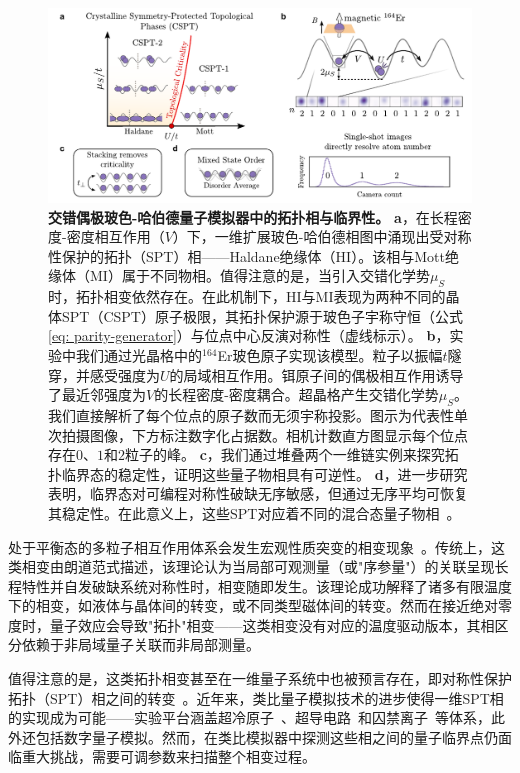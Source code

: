 \documentclass[preprint,superscriptaddress,floatfix,nofootinbib]{revtex4-2}
\begin{document}
\begin{figure}
    \centering
    \includegraphics[width=\textwidth]{figures/Fig_intro_v4.pdf}
    \caption{\textbf{交错偶极玻色-哈伯德量子模拟器中的拓扑相与临界性。}
    \textbf{a}，在长程密度-密度相互作用（$V$）下，一维扩展玻色-哈伯德相图\cite{Torre2006, Berg2008}中涌现出受对称性保护的拓扑（SPT）相——Haldane绝缘体（HI）。该相与Mott绝缘体（MI）属于不同物相。值得注意的是，当引入交错化学势$\mu_S$时，拓扑相变依然存在。在此机制下，HI与MI表现为两种不同的晶体SPT（CSPT）原子极限，其拓扑保护源于玻色子宇称守恒（公式\eqref{eq: parity-generator}）与位点中心反演对称性（虚线标示）\cite{Fuji2015}。
    \textbf{b}，实验中我们通过光晶格中的$^{164}$Er玻色原子实现该模型。粒子以振幅$t$隧穿，并感受强度为$U$的局域相互作用。铒原子间的偶极相互作用诱导了最近邻强度为$V$的长程密度-密度耦合。超晶格产生交错化学势$\mu_S$。我们直接解析了每个位点的原子数而无须宇称投影。图示为代表性单次拍摄图像，下方标注数字化占据数。相机计数直方图显示每个位点存在$0$、$1$和$2$粒子的峰。
    \textbf{c}，我们通过堆叠两个一维链实例来探究拓扑临界态的稳定性，证明这些量子物相具有可逆性。
    \textbf{d}，进一步研究表明，临界态对可编程对称性破缺无序敏感，但通过无序平均可恢复其稳定性。在此意义上，这些SPT对应着不同的混合态量子物相~\cite{Ma2023}。
    }
    \label{fig: setup}
\end{figure}

处于平衡态的多粒子相互作用体系会发生宏观性质突变的相变现象~\cite{Sachdev1999}。传统上，这类相变由朗道范式描述，该理论认为当局部可观测量（或"序参量"）的关联呈现长程特性并自发破缺系统对称性时，相变随即发生。该理论成功解释了诸多有限温度下的相变，如液体与晶体间的转变，或不同类型磁体间的转变。然而在接近绝对零度时，量子效应会导致"拓扑"相变——这类相变没有对应的温度驱动版本，其相区分依赖于非局域量子关联而非局部测量。

值得注意的是，这类拓扑相变甚至在一维量子系统中也被预言存在，即对称性保护拓扑（SPT）相之间的转变~\cite{Senthil2015, Pollmann2010, Turner11, Fidkowski11, Pollmann2012, Schuch2011, Chen2011, Chen2012}。近年来，类比量子模拟技术的进步使得一维SPT相的实现成为可能——实验平台涵盖超冷原子~\cite{Atala2013, Meier2016, Sylvain2019, Sompet2022}、超导电路~\cite{Cai2019}和囚禁离子~\cite{Katz2024}等体系，此外还包括数字量子模拟\cite{Choo2018, Smith2022, Herrmann2022}。然而，在类比模拟器中探测这些相之间的量子临界点仍面临重大挑战，需要可调参数来扫描整个相变过程。
\end{document}

